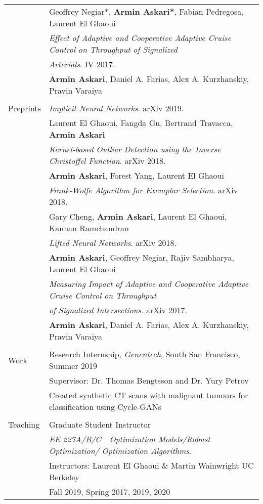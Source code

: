 \documentclass[letterpaper,10pt,oneside]{article}
\begin{document}
\begin{tabular}{@{} l l}
      & \indent \small{Geoffrey Negiar*, \textbf{Armin Askari*},  Fabian Pedregosa, Laurent El Ghaoui}\\
      & \textit{Effect of Adaptive and Cooperative Adaptive Cruise Control on Throughput of Signalized} \\
      & \textit{Arterials}. IV 2017. \\
      & \indent \small{\textbf{Armin Askari},  Daniel A. Farias, Alex A. Kurzhanskiy, Pravin Varaiya}\\
            &\\
\Large{Preprints}  
       &  \textit{Implicit Neural Networks}. arXiv  2019. \\
      & \indent \small{Laurent El Ghaoui, Fangda Gu, Bertrand Travacca, \textbf{Armin Askari}}\\
      &  \textit{Kernel-based Outlier Detection using the Inverse Christoffel Function}. arXiv 2018. \\
      & \indent \small{\textbf{Armin Askari},  Forest Yang, Laurent El Ghaoui}\\
      &  \textit{Frank-Wolfe Algorithm for Exemplar Selection}. arXiv  2018. \\
      & \indent \small{Gary Cheng, \textbf{Armin Askari},  Laurent El Ghaoui, Kannan Ramchandran}\\
 &  \textit{Lifted Neural Networks}. arXiv 2018. \\
      & \indent \small{\textbf{Armin Askari},  Geoffrey Negiar, Rajiv Sambharya, Laurent El Ghaoui}\\
      &  \textit{Measuring Impact of Adaptive and Cooperative Adaptive Cruise Control on Throughput} \\ 	       
      & \textit{of Signalized Intersections}. arXiv 2017. \\
      & \indent \small{\textbf{Armin Askari},  Daniel A. Farias, Alex A. Kurzhanskiy, Pravin Varaiya}\\
      & \\
    \Large{Work} & Research Internship, \textit{Genentech}, South San Francisco, Summer 2019\\
    & Supervisor: Dr. Thomas Bengtsson and Dr. Yury Petrov \\
    & Created synthetic CT scans with malignant tumours for classification using Cycle-GANs\\
    &\\
  \Large{Teaching}   & Graduate Student Instructor\\
  &\textit{EE 227A/B/C---Optimization Models/Robust Optimization/ Optimization Algorithms}. \\
     & Instructors: Laurent El Ghaoui \& Martin Wainwright UC Berkeley\\
     & Fall 2019, Spring 2017, 2019, 2020 \\
     \end{tabular}
\end{document}
